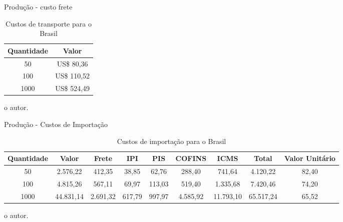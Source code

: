 \begin{frame}{Produção - custo frete}

	\begin{table}[!h]
	\captionsetup{width=9cm}%
	\caption{\label{tab:custos_transporte} Custos de transporte para o Brasil}%
% 	
		\begin{tabular}{cc}
			\toprule
			Quantidade & Valor  \\
			\midrule \midrule
			50 &  US\$ 80,36   \\
			100 &  US\$ 110,52 \\
			1000 & US\$ 524,49 \\
			\bottomrule
		\end{tabular}%
	{%
	\tiny{o autor.}%
	}
	\end{table}



\end{frame}

\begin{frame}{Produção - Custos de Importação}

	\begin{table}[!h]
	\captionsetup{width=10cm}%
	\caption{\label{tab:custos_importacao} Custos de importação para o Brasil}
% 	
		\begin{tabular}{ccccccccc}
			\toprule
			Quantidade & Valor & Frete & IPI & PIS & COFINS & ICMS & Total & Valor Unitário  \\
			\midrule \midrule
            50   & 2.576,22  & 412,35   & 38,85  & 62,76  & 288,40   & 741,64    & 4.120,22  & 82,40 \\
            100  & 4.815,26  & 567,11   & 69,97  & 113,03 & 519,40   & 1.335,68  & 7.420,46  & 74,20 \\
            1000 & 44.831,14 & 2.691,32 & 617,79 & 997,97 & 4.585,92 & 11.793,10 & 65.517,24 & 65,52\\
			\bottomrule
		\end{tabular}%
	{%
	\tiny{o autor.}%
	}
	\end{table}



    
\end{frame}

